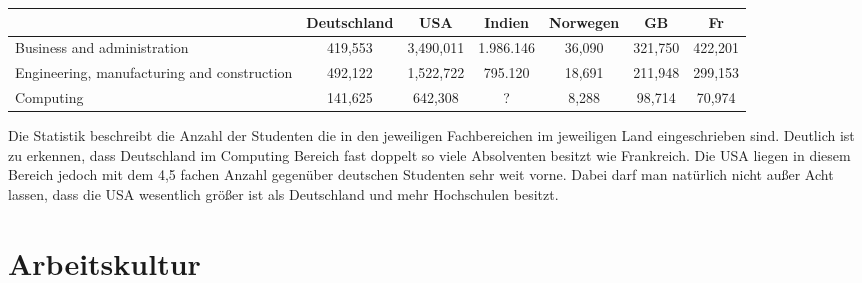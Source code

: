 \begin{table}[htp]
\begin{tabular}{|p{3cm}|c|c|c|c|c|c|}
\hline  	& Deutschland & USA & Indien  & Norwegen & GB & Fr \\ 
\hline  Business and administration & 419,553 & 3,490,011  & 1.986.146  & 36,090 & 321,750 & 422,201 \\ 
\hline  Engineering, manufacturing and construction & 492,122 & 1,522,722 & 795.120 & 18,691 & 211,948 & 299,153 \\ 
\hline  Computing &141,625  & 642,308 &? & 8,288 & 98,714 & 70,974\\ 
\hline 
\end{tabular} 
\end{table}
Die Statistik beschreibt die Anzahl der Studenten die in den jeweiligen Fachbereichen im jeweiligen Land eingeschrieben sind. Deutlich ist zu erkennen, dass Deutschland im Computing Bereich fast doppelt so viele Absolventen besitzt wie Frankreich. Die USA liegen in diesem Bereich jedoch mit dem 4,5 fachen Anzahl gegenüber deutschen Studenten sehr weit vorne. Dabei darf man natürlich nicht außer Acht lassen, dass die USA wesentlich größer ist als Deutschland und mehr Hochschulen besitzt.

\chapter{Arbeitskultur}






